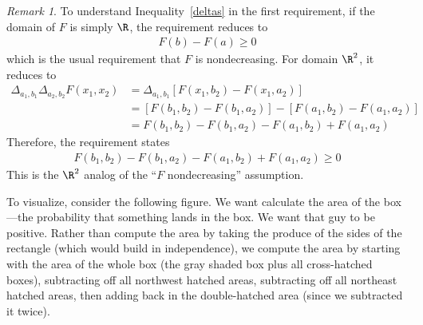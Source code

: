 \documentclass[12pt]{article}
\theoremstyle{plain}
\theoremstyle{definition}
\theoremstyle{remark}
\newtheorem*{rmk}{Remark}
\begin{document}
\begin{rmk}
To understand Inequality~\ref{deltas} in the first requirement, if the
domain of $F$ is simply $\R$, the requirement reduces to
\begin{align*}
  F(b) - F(a) \geq 0
\end{align*}
which is the usual requirement that $F$ is nondecreasing. For domain
$\R^2$, it reduces to
\begin{align*}
  \Delta_{a_1,b_1}
  \Delta_{a_2,b_2}
  F(x_1,x_2)
  &=
  \Delta_{a_1,b_1}
  \left[F(x_1,b_2)-F(x_1,a_2)\right] \\
  &=
  \left[F(b_1,b_2)-F(b_1,a_2)\right]
  -
  \left[F(a_1,b_2)-F(a_1,a_2)\right] \\
  &=
  F(b_1,b_2)-F(b_1,a_2)
  - F(a_1,b_2)+F(a_1,a_2)
\end{align*}
Therefore, the requirement states
\begin{align*}
  F(b_1,b_2)-F(b_1,a_2)
  - F(a_1,b_2)+F(a_1,a_2)
  \geq 0
\end{align*}
This is the $\R^2$ analog of the ``$F$ nondecreasing'' assumption.

To visualize, consider the following figure. We want calculate the
area of the box---the probability that something lands in the box. We
want that guy to be positive. Rather than compute the area by taking the
produce of the sides of the rectangle (which would build in
independence), we compute the area by starting with the area of the
whole box (the gray shaded box plus all cross-hatched boxes),
subtracting off all northwest hatched areas, subtracting off all
northeast hatched areas, then adding back in the double-hatched area
(since we subtracted it twice).
\begin{figure}[htpb!]
\centering
{}
\end{figure}
\end{rmk}
\end{document}
